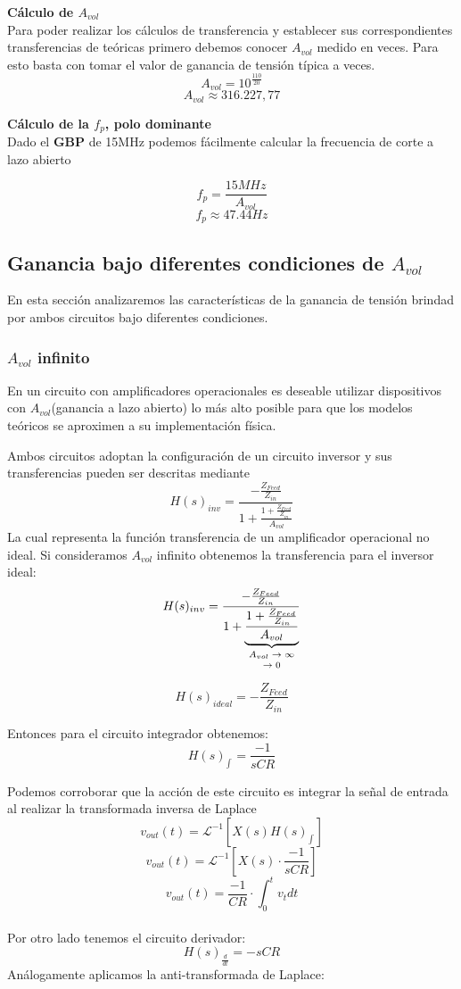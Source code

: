 \textbf{Cálculo de $A_{vol}$}\\
Para poder realizar los cálculos de transferencia y establecer sus correspondientes transferencias de teóricas primero debemos conocer $A_{vol}$ medido en veces. Para esto basta con tomar el valor de ganancia de tensión típica a veces.
$$A_{vol} = 10^{\frac{110}{20}}$$
$$A_{vol} \approx 316.227,77$$

\textbf{Cálculo de  la $f_p$, polo dominante}\\

Dado el \textbf{GBP} de 15MHz podemos fácilmente calcular la frecuencia de corte a lazo abierto

$$ f_p = \frac{15MHz}{A_{vol}} $$
$$ f_p \approx 47.44Hz$$

\subsection{Ganancia bajo diferentes condiciones de $A_{vol}$}
En esta sección analizaremos las características de la ganancia de tensión brindad por ambos circuitos bajo diferentes condiciones.

\subsubsection{$A_{vol}$ infinito}
En un circuito con amplificadores operacionales es deseable utilizar dispositivos con $A_{vol}$(ganancia a lazo abierto) lo más alto posible para que los modelos teóricos se aproximen a su implementación física.

Ambos circuitos adoptan la configuración de un circuito inversor y sus transferencias pueden ser descritas mediante
$$H(s)_{inv} = \frac{-\frac{Z_{Feed}}{Z_{in}}}
{1+\frac{1+\frac{Z_{Feed}}{Z_{in}}}{A_{vol}}} $$
La cual representa la función transferencia de un amplificador operacional no ideal.
Si consideramos $A_{vol}$ infinito obtenemos la transferencia para el inversor ideal:
$$H(s)_{inv} = \frac{-\frac{Z_{Feed}}{Z_{in}}}
				{1+\underbrace{\frac{1+\frac{Z_{Feed}}{Z_{in}}}{A_{vol}}}_{\text{\shortstack{$A_{vol}\rightarrow \infty$ \\ $\rightarrow 0$}}}}$$

$$H(s)_{ideal} =  -\frac{Z_{Feed}}{Z_{in}}$$

Entonces para el circuito integrador obtenemos:
$$H(s)_{\int_{}{}} = \frac{-1}{sCR} $$

Podemos corroborar que la acción de este circuito es integrar la señal de entrada al realizar la transformada inversa de Laplace
$$v_{out}(t) = \mathcal{L}^{-1}[X(s)H(s)_{\int_{}{}}]$$
$$v_{out}(t) = \mathcal{L}^{-1}[X(s)\cdot \frac{-1}{sCR}]$$
$$v_{out}(t)= \frac{-1}{CR} \cdot \int_{0}^{t}v_t dt$$            
\\
Por otro lado tenemos el circuito derivador:
$$H(s)_{\frac{d}{dt}}=-sCR$$
Análogamente aplicamos la anti-transformada de Laplace:

